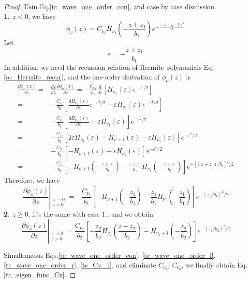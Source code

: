 \begin{proof}
Usin Eq.\eqref{tc_wave_one_order_con}, and case by case discussion.\\
\textbf{1. $z < 0$}, we have
\begin{equation}
  \phi_{\nu}(z) = C_{\nu_1} H_{\nu_1}(-\frac{z+z_1}{b_1}) e^{-\frac{[(z+z_1)/b_1]^2}{2}}
\end{equation}
Let
\begin{equation}
    \varepsilon = -\frac{z+z_1}{b_1}
\end{equation}
In addition, we need the recursion relation of Hermite polynomials Eq.\eqref{oc_Hermite_recur}, and the one-order derivation of $\phi_{\nu}(z)$ is
\begin{equation}
  \begin{aligned}
    \frac{\partial \phi_{\nu}(z)}{\partial z} =& \frac{d\varepsilon}{d z} \frac{\partial \phi_{\nu}(z)}{\partial z} = -\frac{C_{\nu_1}}{b_1} \frac{d}{d\varepsilon} \left[ H_{\nu_1}(\varepsilon) e^{-\varepsilon^2/2} \right]  \\
    =& -\frac{C_{\nu_1}}{b_1} \left[ \frac{d H_{\nu_1}(\varepsilon)}{d\varepsilon}  e^{-\varepsilon^2/2} - \varepsilon H_{\nu_1}(\varepsilon)  e^{-\varepsilon^2/2}\right]  \\
    =& -\frac{C_{\nu_1}}{b_1} \left[ \frac{d H_{\nu_1}(\varepsilon)}{d\varepsilon} - \varepsilon H_{\nu_1}(\varepsilon)\right]  e^{-\varepsilon^2/2}  \\
    =& -\frac{C_{\nu_1}}{b_1} \left[ 2\varepsilon H_{\nu_1}(\varepsilon) - H_{\nu+1}(\varepsilon) - \varepsilon H_{\nu_1}(\varepsilon)\right]  e^{-\varepsilon^2/2}  \\
    =& -\frac{C_{\nu_1}}{b_1} \left[ - H_{\nu+1}(\varepsilon) + \varepsilon H_{\nu_1}(\varepsilon)\right]  e^{-\varepsilon^2/2}  \\
    =& -\frac{C_{\nu_1}}{b_1} \left[ - H_{\nu+1}(-\frac{z+z_1}{b_1}) - \frac{z+z_1}{b_1} H_{\nu_1}(-\frac{z+z_1}{b_1})\right]  e^{-[(z+z_1)/b_1]^2/2}  \label{tc_phi_z_first_der}
  \end{aligned}
\end{equation}
Therefore, we have
\begin{equation}
  \frac{\partial\phi_\nu(z)}{\partial z} \left|_{\substack{z \rightarrow 0 \\ z< 0}} \right. 
  = -\frac{C_{\nu_1}}{b_1} \left[ - H_{\nu+1}(-\frac{z_1}{b_1}) - \frac{z_1}{b_1} H_{\nu_1}(-\frac{z_1}{b_1})\right]  e^{-(z_1/b_1)^2/2} \label{tc_wave_one_order_l}
\end{equation}
\textbf{2. $z \geq 0$}, it's the same with case 1., and we obtain
\begin{equation}
  \frac{\partial\phi_\nu(z)}{\partial z} \left|_{\substack{z \rightarrow 0 \\ z > 0}} \right. 
  = \frac{C_{\nu_2}}{b_2} \left[ -\frac{z_2}{b_2} H_{\nu_2}(\frac{z - z_2}{b_2}) - H_{\nu_2 + 1}(-\frac{z_2}{b_2}) \right] e^{-(z_2/b_2)^2/2} \label{tc_wave_one_order_r}
\end{equation}

Simultaneous Eqs.\eqref{tc_wave_one_order_con}, \eqref{tc_wave_one_order_l}, \eqref{tc_wave_one_order_r}, \eqref{tc_Cv_1}, and eliminate $C_{\nu_1}$, $C_{\nu_2}$, we finally obtain Eq.\eqref{tc_eigen_func_Cv}.
\end{proof}

